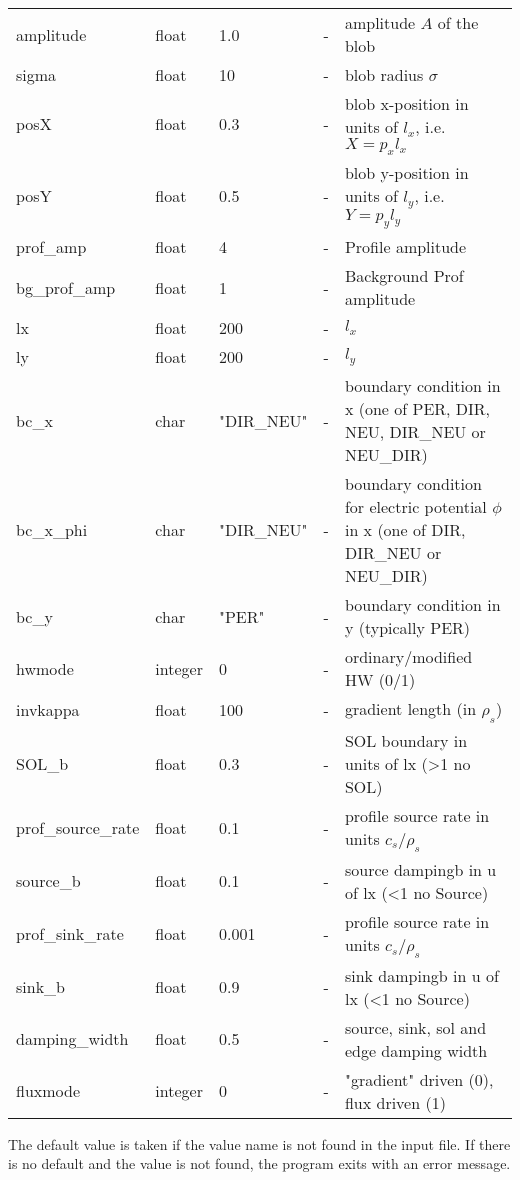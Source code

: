 \begin{longtable}{llll>{\RaggedRight}p{7cm}}
amplitude  & float &1.0    & - & amplitude $A$ of the blob \\
sigma      & float &10     & - & blob radius $\sigma$ \\
posX       & float &0.3    & - & blob x-position in units of $l_x$, i.e. $X = p_x l_x$\\
posY       & float &0.5    & - & blob y-position in units of $l_y$, i.e. $Y = p_y l_y$ \\
prof\_amp    & float &4   & - &Profile amplitude \\
bg\_prof\_amp& float &1   & - &Background Prof amplitude  \\
lx         & float &200    & - & $l_x$  \\
ly         & float &200    & - & $l_y$  \\
bc\_x       & char & "DIR\_NEU"  & - & boundary condition in x (one of PER, DIR, NEU, DIR\_NEU or NEU\_DIR) \\
bc\_x\_phi   & char & "DIR\_NEU" & - & boundary condition for electric potential $\phi$ in x (one of  DIR, DIR\_NEU or NEU\_DIR) \\
bc\_y       & char & "PER"      & - & boundary condition in y (typically PER) \\
hwmode                    & integer & 0    & - & ordinary/modified HW (0/1)\\
invkappa                  & float & 100    & - & gradient length (in $\rho_s$)  \\
SOL\_b                    & float & 0.3    & - & SOL boundary in units of lx (>1 no SOL) \\
prof\_source\_rate        & float & 0.1    & - & profile source rate in units $c_s/\rho_s$ \\
source\_b                 & float & 0.1    & - & source dampingb in u of lx (<1 no Source) \\
prof\_sink\_rate          & float & 0.001  & - & profile source rate in units $c_s/\rho_s$  \\
sink\_b                   & float & 0.9    & - & sink dampingb in u of lx (<1 no Source)   \\
damping\_width            & float & 0.5    & - & source, sink, sol and edge damping width \\
fluxmode                  & integer & 0    & - &"gradient" driven (0), flux driven (1)\\
\bottomrule
\end{longtable}

The default value is taken if the value name is not found in the input file. If there is no default and
the value is not found,
the program exits with an error message.




